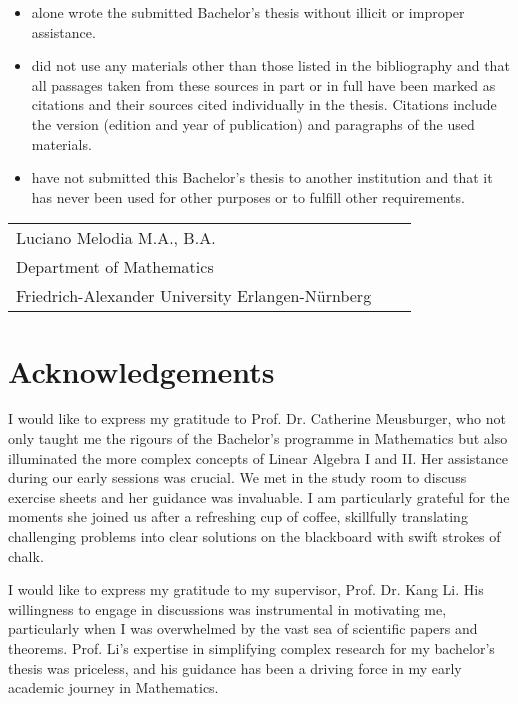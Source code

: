 \documentclass[12pt]{report}
\numberwithin{conj}{section}
\begin{document}
\begin{itemize}
	\item alone wrote the submitted Bachelor's thesis without illicit or improper
	      assistance.
	      	      
	\item did not use any materials other than those listed in the bibliography and
	      that all passages taken from these sources in part or in full have been marked
	      as citations and their sources cited individually in the thesis. Citations
	      include the version (edition and year of publication) and paragraphs of the used materials.
	      	      
	\item have not submitted this Bachelor's thesis to another institution and that
	      it has never been used for other purposes or to fulfill other requirements.
\end{itemize}

\vspace{2cm}
\begin{tabular}{@{}p{5in}p{2in}p{2in}@{}}
	\hrulefill\newline
	Luciano Melodia M.A., B.A. \\
	Department of Mathematics \\
	Friedrich-Alexander University Erlangen-Nürnberg
\end{tabular}

\chapter*{Acknowledgements}
I would like to express my gratitude to Prof. Dr. Catherine Meusburger, who not only taught me the rigours of the Bachelor's programme in Mathematics but also illuminated the more complex concepts of Linear Algebra I and II. Her assistance during our early sessions was crucial. We met in the study room to discuss exercise sheets and her guidance was invaluable. I am particularly grateful for the moments she joined us after a refreshing cup of coffee, skillfully translating challenging problems into clear solutions on the blackboard with swift strokes of chalk.

I would like to express my gratitude to my supervisor, Prof. Dr. Kang Li. His willingness to engage in discussions was instrumental in motivating me, particularly when I was overwhelmed by the vast sea of scientific papers and theorems. Prof. Li's expertise in simplifying complex research for my bachelor's thesis was priceless, and his guidance has been a driving force in my early academic journey in Mathematics.
\end{document}
